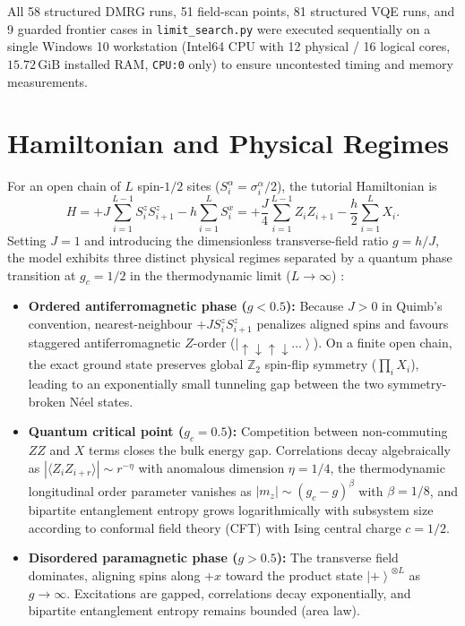 \documentclass[11pt,a4paper]{article}
\providecommand{\ket}[1]{\left|#1\right\rangle}
\begin{document}
All 58 structured DMRG runs, 51 field-scan points, 81 structured VQE runs, and 9 guarded frontier cases in \texttt{limit\_search.py} were executed sequentially on a single Windows 10 workstation (Intel64 CPU with 12 physical / 16 logical cores, $15.72\,\mathrm{GiB}$ installed RAM, \texttt{CPU:0} only) to ensure uncontested timing and memory measurements.

\section{Hamiltonian and Physical Regimes}
For an open chain of $L$ spin-$1/2$ sites ($S_i^\alpha = \sigma_i^\alpha / 2$), the tutorial Hamiltonian is
\begin{equation}
H = +J \sum_{i=1}^{L-1} S_i^z S_{i+1}^z - h \sum_{i=1}^{L} S_i^x
  = +\frac{J}{4} \sum_{i=1}^{L-1} Z_i Z_{i+1} - \frac{h}{2} \sum_{i=1}^{L} X_i.
\label{eq:H}
\end{equation}
Setting $J=1$ and introducing the dimensionless transverse-field ratio $g = h/J$, the model exhibits three distinct physical regimes separated by a quantum phase transition at $g_c = 1/2$ in the thermodynamic limit ($L \to \infty$) \cite{Pfeuty}:
\begin{itemize}[leftmargin=*]
\item \textbf{Ordered antiferromagnetic phase ($g < 0.5$):} Because $J > 0$ in Quimb's convention, nearest-neighbour $+J S_i^z S_{i+1}^z$ penalizes aligned spins and favours staggered antiferromagnetic $Z$-order ($\ket{\uparrow\downarrow\uparrow\downarrow\dots}$). On a finite open chain, the exact ground state preserves global $\mathbb{Z}_2$ spin-flip symmetry ($\prod_i X_i$), leading to an exponentially small tunneling gap between the two symmetry-broken N\'eel states.
\item \textbf{Quantum critical point ($g_c = 0.5$):} Competition between non-commuting $ZZ$ and $X$ terms closes the bulk energy gap. Correlations decay algebraically as $|\langle Z_i Z_{i+r}\rangle| \sim r^{-\eta}$ with anomalous dimension $\eta = 1/4$, the thermodynamic longitudinal order parameter vanishes as $|m_z| \sim (g_c - g)^\beta$ with $\beta = 1/8$, and bipartite entanglement entropy grows logarithmically with subsystem size according to conformal field theory (CFT) with Ising central charge $c = 1/2$.
\item \textbf{Disordered paramagnetic phase ($g > 0.5$):} The transverse field dominates, aligning spins along $+x$ toward the product state $\ket{+}^{\otimes L}$ as $g \to \infty$. Excitations are gapped, correlations decay exponentially, and bipartite entanglement entropy remains bounded (area law).
\end{itemize}
\end{document}
